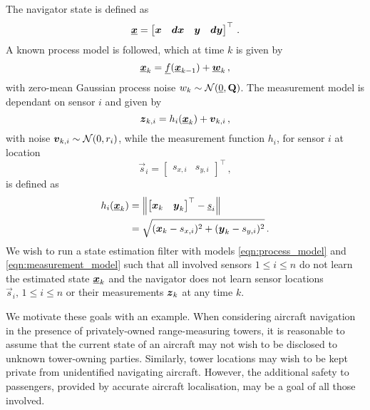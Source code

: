 \documentclass[twocolumn]{autart}
\begin{document}
The navigator state is defined as 
\begin{equation}
    {\boldsymbol{\underline{x}}} = 
    \begin{bmatrix}
        {\boldsymbol{x}} & {\boldsymbol{dx}} & {\boldsymbol{y}} & {\boldsymbol{dy}}
    \end{bmatrix}^\top\,. \label{eqn:state_def}
\end{equation}
A known process model is followed, which at time $k$ is given by
\begin{equation}
    {\boldsymbol{\underline{x}}}_k = {\underline{f}}({\boldsymbol{\underline{x}}}_{k-1})+{\boldsymbol{\underline{w}}}_k\,, \label{eqn:process_model}
\end{equation}
with zero-mean Gaussian process noise $w_k \sim \mathcal{N}({\underline{0}},{{\mathbf{Q}}})$. The measurement model is dependant on sensor $i$ and given by
\begin{equation}
    {\boldsymbol{z}}_{k,i} = h_i({\boldsymbol{\underline{x}}}_k)+{\boldsymbol{v}}_{k,i}\,, \label{eqn:measurement_model}
\end{equation}
with noise ${\boldsymbol{v}}_{k,i} \sim \mathcal{N}(0,r_i)$, while the measurement function $h_i$, for sensor $i$ at location
\begin{equation}
    \vec{s}_i = 
    \begin{bmatrix}
        s_{x,i} & s_{y,i}
    \end{bmatrix}^\top\,,
\end{equation} 
is defined as
\begin{equation}
    \begin{split}
        h_i({\boldsymbol{\underline{x}}}_k) &= \left\lVert
        \begin{bmatrix}
            {\boldsymbol{x}}_k & {\boldsymbol{y}}_k
        \end{bmatrix}^\top
        - {\underline{s}}_{i}\right\rVert \\
        &= \sqrt{({\boldsymbol{x}}_k-s_{x,i})^2 + ({\boldsymbol{y}}_k-s_{y,i})^2}\,.
    \end{split}
\end{equation}
We wish to run a state estimation filter with models \eqref{eqn:process_model} and \eqref{eqn:measurement_model} such that all involved sensors $1 \leq i \leq n$ do not learn the estimated state ${\boldsymbol{\underline{x}}}_k$ and the navigator does not learn sensor locations $\vec{s}_i,\,1 \leq i \leq n$ or their measurements ${\boldsymbol{z}}_k$ at any time $k$.

We motivate these goals with an example. When considering aircraft navigation in the presence of privately-owned range-measuring towers, it is reasonable to assume that the current state of an aircraft may not wish to be disclosed to unknown tower-owning parties. Similarly, tower locations may wish to be kept private from unidentified navigating aircraft. However, the additional safety to passengers, provided by accurate aircraft localisation, may be a goal of all those involved.
\end{document}
